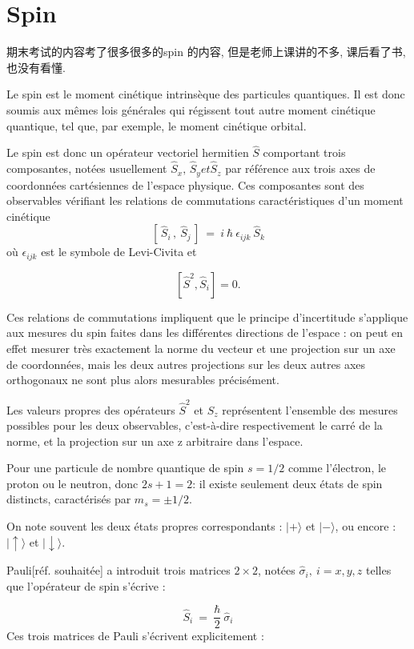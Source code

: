 \documentclass{article}
\begin{document}
\section{Spin}
期末考试的内容考了很多很多的spin 的内容, 但是老师上课讲的不多, 课后看了书, 也没有看懂.

Le spin est le moment cinétique intrinsèque des particules quantiques. 
Il est donc soumis aux mêmes lois générales qui régissent tout autre moment cinétique quantique, tel que, par exemple, le moment cinétique orbital.

Le spin est donc un opérateur vectoriel hermitien $\hat S$ comportant trois composantes, 
notées usuellement $\hat{S}_x, \, \hat{S}_y et  \hat{S}_z$ par référence aux trois axes de coordonnées cartésiennes de l'espace physique. 
Ces composantes sont des observables vérifiant les relations de commutations caractéristiques d'un moment cinétique
$$ \left[ \, \hat{S}_i \, , \ \hat{S}_j \, \right] \ = \ i \  \hbar \ \epsilon_{ijk} \ \hat{S}_k $$
où $\epsilon_{ijk}$ est le symbole de Levi-Civita et

$$ \left [\hat S^2, \hat S_i \right ]=0.  $$

Ces relations de commutations impliquent que le principe d'incertitude s'applique aux mesures du spin faites dans les différentes directions de l'espace : 
on peut en effet mesurer très exactement la norme du vecteur et une projection sur un axe de coordonnées, 
mais les deux autres projections sur les deux autres axes orthogonaux ne sont plus alors mesurables précisément.

Les valeurs propres des opérateurs $\hat S^2$ et $\hat S_z$ représentent l'ensemble des mesures possibles pour les deux observables, 
c'est-à-dire respectivement le carré de la norme, et la projection sur un axe z arbitraire dans l'espace.

Pour une particule de nombre quantique de spin $s = 1/2$ comme l'électron, le proton ou le neutron, donc $2s + 1 = 2$: 
il existe seulement deux états de spin distincts, caractérisés par $m_s = \pm 1/2$.

On note souvent les deux états propres correspondants : $|+\rangle$  et $|-\rangle$, ou encore : $|\uparrow\rangle$  et $|\downarrow\rangle$.

Pauli[réf. souhaitée] a introduit trois matrices $2 × 2$, notées $\hat{\sigma}_i, \ i = x,y,z$ telles que l'opérateur de spin s'écrive :

$$ \hat{S}_i  \ = \ \frac{\hbar}{2} \ \hat{\sigma}_i $$
Ces trois matrices de Pauli s'écrivent explicitement :
\end{document}
